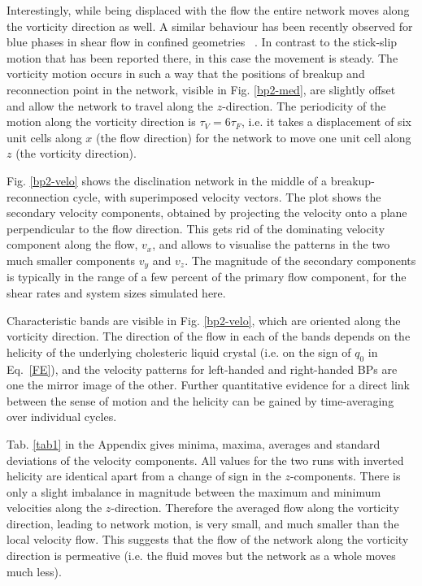 \documentclass[aps,pre,reprint,superscriptaddress, twocolumn]{revtex4}
\begin{document}
Interestingly, while being displaced with the flow the entire network moves 
along the vorticity direction as well.  A similar behaviour has been recently 
observed for blue phases in shear flow in confined geometries ~\cite{Henrich:2012b}.
In contrast to the stick-slip motion that has been reported there,
in this case the movement is steady. 
The vorticity motion occurs in such a way that the positions of breakup and reconnection 
point in the network, visible in Fig. \ref{bp2-med}, are slightly offset and allow the network 
to travel along the $z$-direction. The periodicity of the motion along the vorticity direction
is $\tau_V=6\tau_F$, 
i.e. it takes a displacement of six unit cells along $x$ (the flow direction) 
for the network to move one unit cell along $z$ (the vorticity direction).

Fig. \ref{bp2-velo} shows the disclination network in the middle of a breakup-reconnection
cycle, with superimposed velocity vectors.
The plot shows the secondary velocity components, obtained by projecting the
velocity onto a plane perpendicular to the flow direction.
This gets rid of the dominating velocity component along the flow, $v_x$, and 
allows to visualise the patterns in the 
two much smaller components $v_y$ and $v_z$.
The magnitude of the secondary components is typically in the range of a 
few percent of the primary flow component, for the shear rates 
and system sizes simulated here.

Characteristic bands are visible in Fig. \ref{bp2-velo}, which are 
oriented along the vorticity direction. The direction of the flow
in each of the bands depends on the helicity of the underlying cholesteric
liquid crystal (i.e. on the sign of $q_0$ in Eq.~\ref{FE}), and the velocity
patterns for left-handed and right-handed BPs are one the mirror image of
the other. 
Further quantitative evidence for a direct link between the sense of motion 
and the helicity can be gained by time-averaging over individual cycles.

Tab. \ref{tab1} in the Appendix 
gives minima, maxima, averages and standard deviations 
of the velocity components.
All values for the two runs with inverted helicity are identical apart 
from a change of sign in the $z$-components.
There is only a slight imbalance in magnitude 
between the maximum and minimum velocities 
along the $z$-direction. Therefore the averaged flow along the vorticity
direction, leading to network motion, is very small, and much smaller than
the local velocity flow. This suggests that the
flow of the network along the vorticity 
direction is permeative (i.e. the fluid moves but the network as a whole 
moves much less). 
\end{document}
